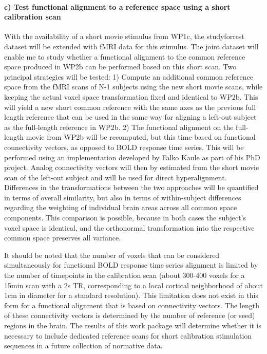 \paragraph{c) Test functional alignment to a reference space using a short
calibration scan}
%
With the availability of a short movie stimulus from WP1c, the studyforrest
dataset will be extended with fMRI data for this stimulus.
%
The joint dataset will enable me to study whether a functional alignment to the
common reference space produced in WP2b can be performed based on this short
scan. Two principal strategies will be tested:
%
1) Compute an additional common reference space from the fMRI scans of N-1
subjects using the new short movie scans, while keeping the actual voxel space
transformation fixed and identical to WP2b.
%
This will yield a new short common reference with the same axes as the previous
full length reference that can be used in the same way for aligning a left-out
subject as the full-length reference in WP2b.
%
2) The functional alignment on the full-length movie from WP2b will be
recomputed, but this time based on functional connectivity vectors, as opposed
to BOLD response time series.
%
This will be performed using an implementation developed by Falko Kaule as part
of his PhD project.
%
Analog connectivity vectors will then by estimated from the short movie scan of
the left-out subject and will be used for direct hyperalignment.
%
Differences in the transformations between the two approaches will be quantified
in terms of overall similarity, but also in terms of within-subject differences
regarding the weighting of individual brain areas across all common space
components.
%
This comparison is possible, because in both cases the subject’s voxel space is
identical, and the orthonormal transformation into the respective common space
preserves all variance.

%
It should be noted that the number of voxels that can be considered
simultaneously for functional BOLD response time series alignment is limited by
the number of timepoints in the calibration scan (about 300-400 voxels for a
15min scan with a 2s TR, corresponding to a local cortical neighborhood of about
1cm in diameter for a standard resolution).
%
This limitation does not exist in
this form for a functional alignment that is based on connectivity vectors.
%
The
length of these connectivity vectors is determined by the number of reference
(or seed) regions in the brain.
%
The results of this work package will
determine whether it is necessary to include dedicated reference scans for short
calibration stimulation sequences in a future collection of normative data.


